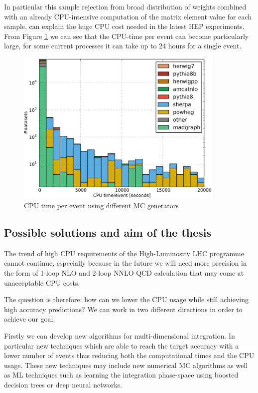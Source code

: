 \documentclass[../main/main.tex]{subfiles}
\begin{document}
In particular this sample rejection from broad distribution of weights combined with an already CPU-intensive computation of the matrix element value for each sample,  can explain the huge CPU cost needed in the latest HEP experiments.  From Figure \ref{CPU-time} we can see that the CPU-time per event can become particularly large,  for some current processes it can take up to 24 hours for a single event.


\begin{figure}[]
	\centering
	\includegraphics[width = 10cm]{../images/CPU-time.png}
	\caption{CPU time per event using different MC generators}
	\label{CPU-time}
\end{figure}


\subsection{Possible solutions and aim of the thesis}

The trend of high CPU requirements of the High-Luminosity LHC programme cannot continue, especially because in the future we will need
more precision in the form of 1-loop NLO and 2-loop NNLO QCD calculation that may come at unacceptable CPU costs.

The question is therefore: how can we lower the CPU usage while still achieving high accuracy predictions?
We can work in two different directions in order to achieve our goal.

Firstly we can develop new algorithms for multi-dimensional integration. In particular new techniques which are able to reach the target accuracy
with a lower number of events thus reducing both the computational times and the CPU usage. These new techniques may include new numerical
MC algorithms as well as ML techniques such as  learning the integration phase-space using boosted decision trees or deep neural networks. 
\end{document}
